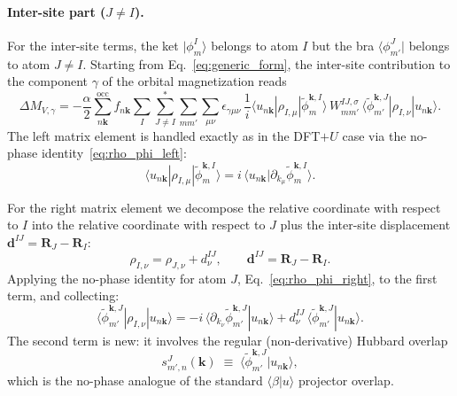 \documentclass[11pt]{article}
\begin{document}
\paragraph{Inter-site part ($J\ne I$).}
For the inter-site terms, the ket $|\phi^I_m\rangle$ belongs to atom
$I$ but the bra $\langle\phi^J_{m'}|$ belongs to atom $J\ne I$.
Starting from Eq.~\eqref{eq:generic_form}, the inter-site contribution
to the component $\gamma$ of the orbital magnetization reads
\begin{equation}
  \Delta M_{V,\gamma}
  =
  -\frac{\alpha}{2}
  \sum_{n\mathbf{k}}^{\mathrm{occ}}f_{n\mathbf{k}}
  \sum_{I}\sum_{J\ne I}^{*}\sum_{mm'}\sum_{\mu\nu}
  \epsilon_{\gamma\mu\nu}\,\frac{1}{i}
  \langle u_{n\mathbf{k}}|\rho_{I,\mu}|\widetilde\phi^{\mathbf{k},I}_{m}\rangle
  \,W_{mm'}^{IJ,\sigma}\,
  \langle\widetilde\phi^{\mathbf{k},J}_{m'}|\rho_{I,\nu}|u_{n\mathbf{k}}\rangle.
  \label{eq:deltaM_V_components}
\end{equation}
The left matrix element is handled exactly as in the DFT$+U$ case via
the no-phase identity~\eqref{eq:rho_phi_left}:
\begin{equation}
  \langle u_{n\mathbf{k}}|\rho_{I,\mu}|\widetilde\phi^{\mathbf{k},I}_{m}\rangle
  =
  i\,\langle u_{n\mathbf{k}}|\partial_{k_\mu}\widetilde\phi^{\mathbf{k},I}_{m}\rangle.
  \label{eq:left_I}
\end{equation}

For the right matrix element we decompose the relative coordinate with
respect to $I$ into the relative coordinate with respect to $J$ plus
the inter-site displacement $\mathbf{d}^{IJ}=\mathbf{R}_J-\mathbf{R}_I$:
\begin{equation}
  \rho_{I,\nu} = \rho_{J,\nu} + d^{IJ}_\nu,
  \qquad
  \mathbf{d}^{IJ} = \mathbf{R}_J - \mathbf{R}_I.
  \label{eq:rho_decomp}
\end{equation}
Applying the no-phase identity for atom $J$,
Eq.~\eqref{eq:rho_phi_right}, to the first term, and collecting:
\begin{equation}
  \langle\widetilde\phi^{\mathbf{k},J}_{m'}|\rho_{I,\nu}|u_{n\mathbf{k}}\rangle
  =
  -i\,\langle\partial_{k_\nu}\widetilde\phi^{\mathbf{k},J}_{m'}|u_{n\mathbf{k}}\rangle
  +
  d^{IJ}_\nu\,
  \langle\widetilde\phi^{\mathbf{k},J}_{m'}|u_{n\mathbf{k}}\rangle.
  \label{eq:right_IJ}
\end{equation}
The second term is new: it involves the regular (non-derivative) Hubbard
overlap
\begin{equation}
  s^{J}_{m',n}(\mathbf{k})
  \;\equiv\;
  \langle\widetilde\phi^{\mathbf{k},J}_{m'}|u_{n\mathbf{k}}\rangle,
  \label{eq:hubbecp}
\end{equation}
which is the no-phase analogue of the standard $\langle\beta|u\rangle$
projector overlap.
\end{document}
